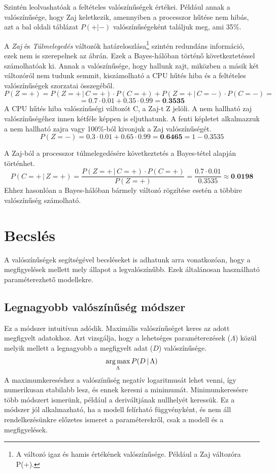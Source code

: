 Szintén leolvashatóak a feltételes valószínűségek értékei. Például annak a valószínűsége, hogy Zaj keletkezik, amennyiben a processzor hűtése nem hibás, azt a bal oldali táblázat $P(+|-)$ valószínűségeként találjuk meg, ami 35\%.

A \emph{Zaj} és \emph{Túlmelegedés} változók határeloszlása\footnote{A változó igaz és hamis értékének valószínűsége. Például a Zaj változóra P(+).} szintén redundáns információ, ezek nem is szerepelnek az ábrán. Ezek a Bayes-hálóban történő következtetéssel számolhatóak ki. Annak a valószínűsége, hogy hallunk zajt, miközben a másik két változóról nem tudunk semmit, kiszámolható a CPU hűtés hiba és a feltételes valószínűségek szorzatai összegéből.
$$P(Z=+) = P(Z=+\,|\,C=+) \cdot P(C=+) + P(Z=+\,|\,C=-) \cdot P(C=-) =$$
$$= 0.7 \cdot 0.01 + 0.35 \cdot 0.99 = \textbf{0.3535} $$
A CPU hűtés hiba valószínűségi változót C, a Zaj-t Z jelöli. A nem hallható zaj valószínűségéhez innen kétféle képpen is eljuthatunk. A fenti képletet alkalmazzuk a nem hallható zajra vagy 100\%-ból kivonjuk a Zaj valószínűségét.
$$P(Z=-) = 0.3 \cdot 0.01 + 0.65 \cdot 0.99 = \textbf{0.6465} = 1-0.3535 $$

A Zaj-ból a processzor túlmelegedésére következtetés a Bayes-tétel alapján történhet.
$$P(C=+\,|\,Z=+) = \frac{P(Z=+\,|\,C=+) \cdot P(C=+)}{P(Z=+)} = \frac{0.7 \cdot 0.01}{0.3535} \approx \textbf{0.0198}$$
Ehhez hasonlóan a Bayes-hálóban bármely változó rögzítése esetén a többire valószínűség számolható.


\section{Becslés}
A valószínűségek segítségével becsléseket is adhatunk arra vonatkozóan, hogy a megfigyelések mellett mely állapot a legvalószínűbb. Ezek általánosan használható paraméterezhető modellekre.

\subsection{Legnagyobb valószínűség módszer}
Ez a módszer intuitívan adódik. Maximális valószínűséget keres az adott megfigyelt adatokhoz. Azt vizsgálja, hogy a lehetséges paraméterezések ($\Lambda$) közül melyik mellett a legnagyobb a megfigyelt adat ($D$) valószínűsége.
$$\operatorname*{arg\,max}_{\Lambda}{P(D\,|\,\Lambda)}$$
A maximumkereséshez a valószínűség negatív logaritmusát lehet venni, így numerikusan stabilabb lesz, és ennek keresni a minimumát. Minimumkeresésre több módszert ismerünk, például a deriváltjának nullhelyét keressük. Ez a módszer jól alkalmazható, ha a modell felírható függvényként, és nem áll rendelkezésünkre előzetes ismeret a paraméterekről, csak a modell és a megfigyelések. 


